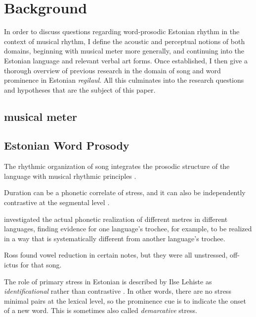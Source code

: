 \chapter{Background}
In order to discuss questions regarding word-prosodic Estonian rhythm in the context of musical rhythm, I define the acoustic and perceptual notions of both domains, beginning with musical meter more generally, and continuing into the Estonian language and relevant verbal art forms. Once established, I then give a thorough overview of
 previous research in the domain of song and word prominence in Estonian {\it regilaul}. All this culminates into the research questions and hypotheses that are the subject of this paper. 
\section{musical meter}




\section{Estonian Word Prosody}



The rhythmic organization of song integrates the prosodic structure of the language with musical rhythmic principles \citep{palmerLinguisticProsodyMusical1992}. 

Duration can be a phonetic correlate of stress, and it can also be independently contrastive at the segmental level \citep{lehistePhoneticsMetrics1992}. 







\citep{lehistePhoneticsMetrics1992} investigated the actual phonetic realization of different metres in different languages, finding evidence for one language's trochee, for example, to be realized in a way that is systematically different from another language's trochee. 

Ross found vowel reduction in certain notes, but they were all unstressed, off-ictus for that song\citep{rossFormants90}.


The role of primary stress in Estonian is described by Ilse Lehiste as {\it identificational} rather than contrastive \citep{lehistePhoneticsMetrics1992}. In other words, there are no stress minimal pairs at the lexical level, so the prominence cue is to indicate the onset of a new word. This is sometimes also called {\it demarcative} stress.




